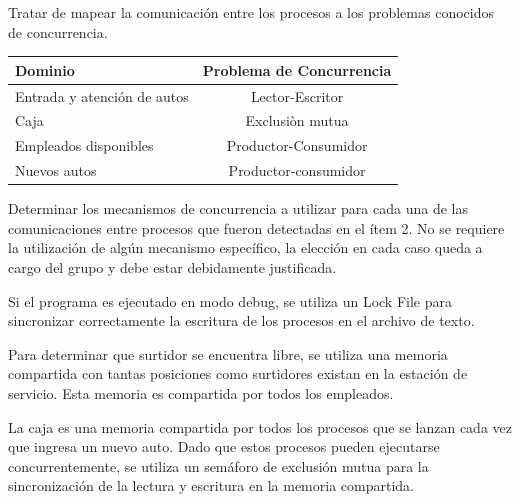 \documentclass[12pt,a4paper,titlepage,oneside]{article}
\renewenvironment{itemize}{
 \begin{list}{}{
  \setlength{\leftmargin}{1.5em}
 }
}{
 \end{list}
}
\begin{document}
\begin{enumerate}
\item Tratar de mapear la comunicación entre los procesos a los problemas conocidos de concurrencia.

\bigskip
\begin{center}
   \begin{tabular}[1.5\textwidth]{| l | c |}
     \hline
     \textbf{Dominio} & \textbf{Problema de Concurrencia}  \\ \hline
     Entrada y atención de autos & Lector-Escritor  \\ \hline
     Caja & Exclusiòn mutua\\ \hline
     Empleados disponibles & Productor-Consumidor\\ \hline
     Nuevos autos & Productor-consumidor\\ 
     \hline
   \end{tabular}
 \end{center}
 
\newpage
\item Determinar los mecanismos de concurrencia a utilizar para cada una de las comunicaciones entre procesos que fueron detectadas en el ítem 2. No se requiere la utilización de algún mecanismo específico, la elección en cada caso queda a cargo del grupo y debe estar debidamente justificada.

\begin{itemize}
\item[•] Si el programa es ejecutado en modo debug, se utiliza un Lock File para sincronizar correctamente la escritura de los procesos en el archivo de texto.
\item[•] Para determinar que surtidor se encuentra libre, se utiliza una memoria compartida con tantas posiciones como surtidores existan en la estación de servicio. Esta memoria es compartida por todos los empleados.
\item[•] La caja es una memoria compartida por todos los procesos que se lanzan cada vez que ingresa un nuevo auto. Dado que estos procesos pueden ejecutarse concurrentemente, se utiliza un semáforo de exclusión mutua para la sincronización de la lectura y escritura en la memoria compartida.
\end{itemize}
\end{enumerate}
\end{document}
